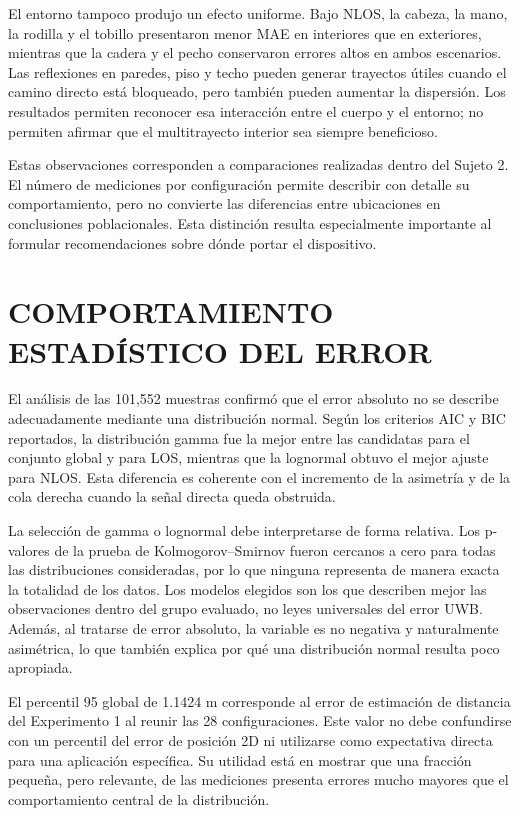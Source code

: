 El entorno tampoco produjo un efecto uniforme. Bajo NLOS, la cabeza, la mano, la rodilla y el tobillo presentaron menor MAE en interiores que en exteriores, mientras que la cadera y el pecho conservaron errores altos en ambos escenarios. Las reflexiones en paredes, piso y techo pueden generar trayectos útiles cuando el camino directo está bloqueado, pero también pueden aumentar la dispersión. Los resultados permiten reconocer esa interacción entre el cuerpo y el entorno; no permiten afirmar que el multitrayecto interior sea siempre beneficioso.

Estas observaciones corresponden a comparaciones realizadas dentro del Sujeto 2. El número de mediciones por configuración permite describir con detalle su comportamiento, pero no convierte las diferencias entre ubicaciones en conclusiones poblacionales. Esta distinción resulta especialmente importante al formular recomendaciones sobre dónde portar el dispositivo.

\section{COMPORTAMIENTO ESTADÍSTICO DEL ERROR}
\label{sec:analisis_variabilidad}

El análisis de las 101,552 muestras confirmó que el error absoluto no se describe adecuadamente mediante una distribución normal. Según los criterios AIC y BIC reportados, la distribución gamma fue la mejor entre las candidatas para el conjunto global y para LOS, mientras que la lognormal obtuvo el mejor ajuste para NLOS. Esta diferencia es coherente con el incremento de la asimetría y de la cola derecha cuando la señal directa queda obstruida.

La selección de gamma o lognormal debe interpretarse de forma relativa. Los p-valores de la prueba de Kolmogorov--Smirnov fueron cercanos a cero para todas las distribuciones consideradas, por lo que ninguna representa de manera exacta la totalidad de los datos. Los modelos elegidos son los que describen mejor las observaciones dentro del grupo evaluado, no leyes universales del error UWB. Además, al tratarse de error absoluto, la variable es no negativa y naturalmente asimétrica, lo que también explica por qué una distribución normal resulta poco apropiada.

El percentil 95 global de 1.1424 m corresponde al error de estimación de distancia del Experimento 1 al reunir las 28 configuraciones. Este valor no debe confundirse con un percentil del error de posición 2D ni utilizarse como expectativa directa para una aplicación específica. Su utilidad está en mostrar que una fracción pequeña, pero relevante, de las mediciones presenta errores mucho mayores que el comportamiento central de la distribución.

